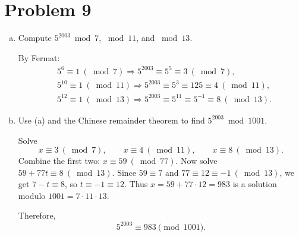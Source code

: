 \section*{Problem 9}

\begin{enumerate}[(a)]
\item Compute $5^{2003}\bmod 7$, $\bmod 11$, and $\bmod 13$.

By Fermat:
\[
\begin{aligned}
&5^{6}\equiv 1 \ (\bmod 7) \Rightarrow 5^{2003}\equiv 5^{5}\equiv 3 \ (\bmod 7),\\
&5^{10}\equiv 1 \ (\bmod 11) \Rightarrow 5^{2003}\equiv 5^{3}\equiv 125\equiv 4 \ (\bmod 11),\\
&5^{12}\equiv 1 \ (\bmod 13) \Rightarrow 5^{2003}\equiv 5^{11}\equiv 5^{-1}\equiv 8 \ (\bmod 13).
\end{aligned}
\]

\item Use (a) and the Chinese remainder theorem to find $5^{2003}\bmod 1001$.

Solve
\[
x\equiv 3\ (\bmod 7),\qquad x\equiv 4\ (\bmod 11),\qquad x\equiv 8\ (\bmod 13).
\]
Combine the first two: $x\equiv 59 \ (\bmod 77)$. Now solve $59+77t\equiv 8\ (\bmod 13)$.
Since $59\equiv 7$ and $77\equiv 12\equiv -1\ (\bmod 13)$, we get $7 - t \equiv 8$, so $t\equiv -1\equiv 12$.
Thus $x=59+77\cdot 12=983$ is a solution modulo $1001=7\cdot 11\cdot 13$.

Therefore,
\[
\boxed{5^{2003}\equiv 983 \pmod{1001}}.
\]
\end{enumerate}
